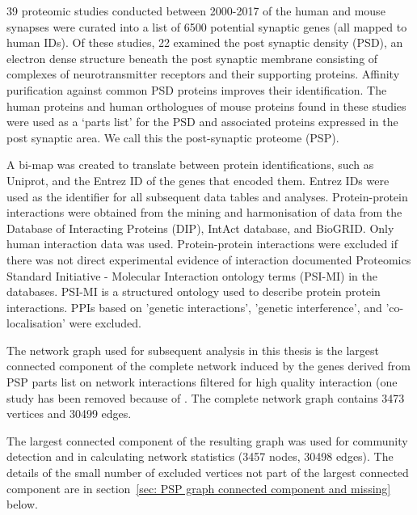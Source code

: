 39 proteomic studies conducted between 2000-2017 of the human and mouse synapses were curated into a list of 6500 potential synaptic genes (all mapped to human IDs). \cite{heil2018systems}  Of these studies, 22 examined the post synaptic density (PSD), an electron dense structure beneath the post synaptic membrane \cite{PALAY1956}  consisting of complexes of neurotransmitter receptors and their supporting proteins. \cite{kennedy2000signal}  Affinity purification against common PSD proteins improves their identification. \cite{ewing2007large}  The human proteins and human orthologues of mouse proteins found in these studies were used as a ‘parts list’ for the PSD and associated proteins expressed in the post synaptic area. We call this the post-synaptic proteome (PSP).

  A bi-map was created to translate between protein identifications, such as Uniprot\cite{uniprot2017uniprot}, and the Entrez ID of the genes that encoded them. Entrez IDs were used as the identifier for all subsequent data tables and analyses. Protein-protein interactions were obtained from the mining and harmonisation of data from the Database of Interacting Proteins (DIP), \cite{xenarios2002dip}  IntAct database, \cite{orchard2014mintact}  and BioGRID. \cite{chatr2017biogrid}  Only human interaction data was used. Protein-protein interactions were excluded if there was not direct experimental evidence of interaction documented  Proteomics Standard Initiative - Molecular Interaction ontology terms (PSI-MI) in the databases. PSI-MI is a structured ontology used to describe protein protein interactions.\cite{isserlin2011biomolecular} PPIs based on 'genetic interactions', 'genetic interference', and 'co-localisation' were excluded.

 The network graph used for subsequent analysis in this thesis is the largest connected component of the complete network induced by the genes derived from PSP parts list on network interactions filtered for high quality interaction (one study has been removed because of . The complete network graph contains 3473 vertices and 30499 edges. 
 
The largest connected component of the resulting graph was used for community detection and in calculating network statistics (3457 nodes, 30498 edges). The details of the small number of excluded vertices not part of the largest connected component are in section~\ref{sec: PSP graph connected component and missing} below.

